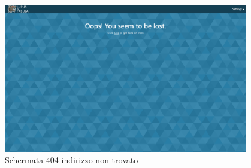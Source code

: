 \begin{figure}[H]
\begin{minipage}{0.25\textwidth}
    \end{minipage}\hfill
    \begin{minipage}{0.75\textwidth}
        \centering
        \includegraphics[width=0.95\textwidth]{img/screen/desktop/404_desktop.png}
    \end{minipage}
    \caption{Schermata 404 indirizzo non trovato}
    \label{fig:404_ui}
\end{figure}
